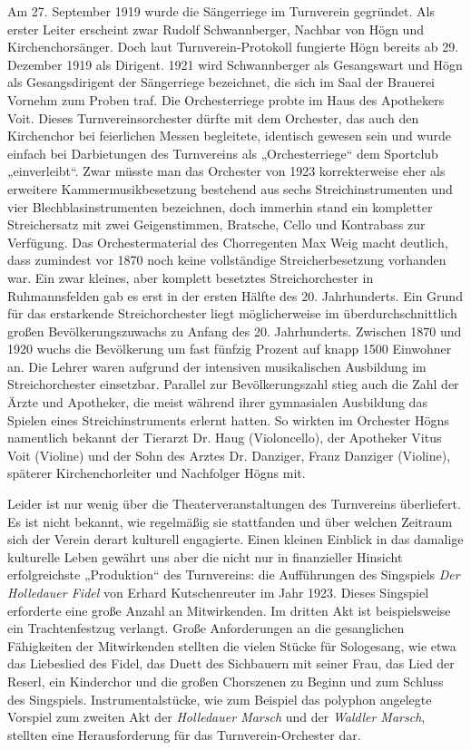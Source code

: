\documentclass{book}
\begin{document}
Am 27. September 1919 wurde die Sängerriege im Turnverein gegründet. Als
erster Leiter erscheint zwar Rudolf Schwannberger, Nachbar von Högn und
Kirchenchorsänger. Doch laut Turnverein-Protokoll fungierte Högn
be\-reits ab 29. Dezember 1919 als Dirigent. 1921 wird Schwannberger
als Ge\-sangswart und Högn als Gesangsdirigent der Sängerriege
bezeichnet, die sich im Saal der Brauerei Vornehm zum Proben traf. Die
Orchesterriege probte im Haus des Apothekers Voit. Dieses
Turnvereinsorchester dürfte mit dem Or\-chester, das auch den
Kirchenchor bei feierlichen Messen begleitete, iden\-tisch gewesen sein
und wurde einfach bei Darbietungen des Turnvereins als „Orchesterriege“
dem Sportclub „einverleibt“. Zwar müsste man das Orche\-ster von 1923
korrekterweise eher als erweitere Kammermusikbesetzung be\-stehend aus
sechs Streichinstrumenten und vier Blechblasinstrumenten be\-zeichnen,
doch immerhin stand ein kompletter Streichersatz mit zwei
Geigen\-stimmen, Bratsche, Cello und Kontrabass zur Verfügung. Das
Orchester\-material des Chorregenten Max Weig macht deutlich, dass
zumindest vor 1870 noch keine vollständige Streicherbesetzung vorhanden
war. Ein zwar kleines, aber komplett besetztes Streichorchester in
Ruh\-mannsfelden gab es erst in der ersten Hälfte des 20. Jahrhunderts.
Ein Grund für das erstarkende Streich\-orchester liegt möglicherweise
im überdurchschnittlich großen Bevölkerungs\-zuwachs zu Anfang des 20.
Jahrhunderts. Zwischen 1870 und 1920 wuchs die Bevölkerung um fast
fünfzig Prozent auf knapp 1500 Einwohner an. Die Lehrer waren aufgrund
der intensiven musikalischen Ausbildung im Streich\-orchester
einsetzbar. Parallel zur Bevölkerungszahl stieg auch die Zahl der Ärzte
und Apotheker, die meist während ihrer gymnasialen Ausbildung das
Spielen eines Streichinstruments erlernt hatten. So wirkten im
Orchester Högns namentlich bekannt der Tierarzt Dr. Haug (Violoncello),
der Apo\-theker Vitus Voit (Violine) und der Sohn des Arztes Dr.
Danziger, Franz Danziger (Violine), späterer Kirchenchorleiter und
Nachfolger Högns mit.

Leider ist nur wenig über die Theaterveranstaltungen des Turnvereins
überliefert. Es ist nicht bekannt, wie regelmäßig sie stattfanden und
über welchen Zeitraum sich der Verein derart kulturell engagierte.
Einen klei\-nen Einblick in das damalige kulturelle Leben gewährt uns
aber die nicht nur in fi\-nanzieller Hinsicht erfolgreichste
„Produktion“ des Turnvereins: die Auffüh\-rungen des Singspiels
\textit{Der Holledauer Fidel} von Erhard Kutschenreuter im Jahr 1923.
Dieses Singspiel erforderte eine große Anzahl an Mitwirkenden. Im
dritten Akt ist beispielsweise ein Trachtenfestzug verlangt. Große
Anfor\-derungen an die gesanglichen Fähigkeiten der Mitwirkenden
stellten die vielen Stücke für Sologesang, wie etwa das Liebeslied des
Fidel, das Duett des Sich\-bauern mit seiner Frau, das Lied der Reserl,
ein Kinderchor und die großen Chorszenen zu Beginn und zum Schluss des
Singspiels. Instrumentalstücke, wie zum Beispiel das polyphon angelegte
Vorspiel zum zweiten Akt der \textit{Holle\-dauer Marsch} und der
\textit{Waldler Marsch}, stellten eine Herausforderung für das
Turnverein-Orchester dar.
\end{document}
